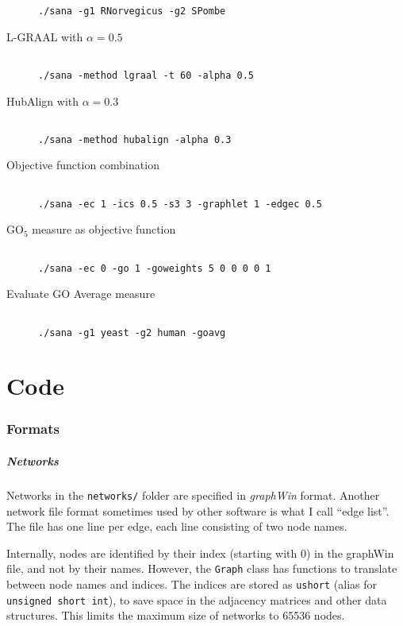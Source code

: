 \documentclass[]{article}
\begin{document}
\begin{description}
\begin{verbatim}
./sana -g1 RNorvegicus -g2 SPombe
\end{verbatim}
\item[L-GRAAL with $\alpha=0.5$]
\begin{verbatim}

./sana -method lgraal -t 60 -alpha 0.5
\end{verbatim}
\item[HubAlign with $\alpha=0.3$]
\begin{verbatim}

./sana -method hubalign -alpha 0.3
\end{verbatim}
\item[Objective function combination]
\begin{verbatim}

./sana -ec 1 -ics 0.5 -s3 3 -graphlet 1 -edgec 0.5
\end{verbatim}
\item[$\mbox{GO}_5$ measure as objective function]
\begin{verbatim}

./sana -ec 0 -go 1 -goweights 5 0 0 0 0 1
\end{verbatim}
\item[Evaluate GO Average measure]
\begin{verbatim}

./sana -g1 yeast -g2 human -goavg
\end{verbatim}
\end{description}

\part{Code}

\section{Formats}\label{formats}
\subsubsection*{Networks}
Networks in the \texttt{networks/} folder are specified in \textit{graphWin} format. Another network file format sometimes used by other software is what I call ``edge list''. The file has one line per edge, each line consisting of two node names.

Internally, nodes are identified by their index (starting with 0) in the graphWin file, and not by their names. However, the \texttt{Graph} class has functions to translate between node names and indices. The indices are stored as \texttt{ushort} (alias for \texttt{unsigned short int}), to save space in the adjacency matrices and other data structures. This limits the maximum size of networks to 65536 nodes.
\end{document}

